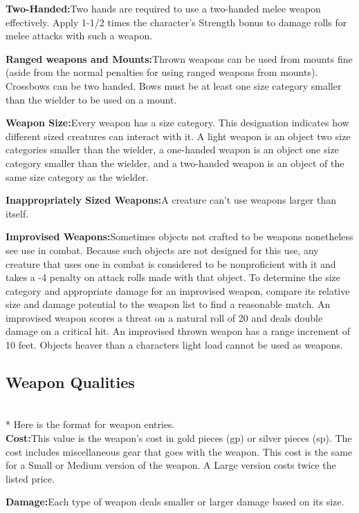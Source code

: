 \noindent\textbf{Two-Handed:}{Two hands are required to use a two-handed melee weapon effectively. Apply 1-1/2 times the character’s Strength bonus to damage rolls for melee attacks with such a weapon.}

\noindent\textbf{Ranged weapons and Mounts:}{Thrown weapons can be used from mounts fine (aside from the normal penalties for using ranged weapons from mounts). Crossbows can be two handed. Bows must be at least one size category smaller than the wielder to be used on a mount.}

\noindent\textbf{Weapon Size:}{Every weapon has a size category. This designation indicates how different sized creatures can interact with it. A light weapon is an object two size categories smaller than the wielder, a one-handed weapon is an object one size category smaller than the wielder, and a two-handed weapon is an object of the same size category as the wielder.}

\noindent\textbf{Inappropriately Sized Weapons:}{A creature can't use weapons larger than itself.}

\noindent\textbf{Improvised Weapons:}{Sometimes objects not crafted to be weapons nonetheless see use in combat. Because such objects are not designed for this use, any creature that uses one in combat is considered to be nonproficient with it and takes a -4 penalty on attack rolls made with that object. To determine the size category and appropriate damage for an improvised weapon, compare its relative size and damage potential to the weapon list to find a reasonable match. An improvised weapon scores a threat on a natural roll of 20 and deals double damage on a critical hit. An improvised thrown weapon has a range increment of 10 feet. Objects heaver than a characters light load cannot be used as weapons.}

\subsection{Weapon Qualities}
~\\*
Here is the format for weapon entries. \\

\noindent\textbf{Cost:}{This value is the weapon’s cost in gold pieces (gp) or silver pieces (sp). The cost includes miscellaneous gear that goes with the weapon. This cost is the same for a Small or Medium version of the weapon. A Large version costs twice the listed price.}

\noindent\textbf{Damage:}{Each type of weapon deals smaller or larger damage based on its size.}

